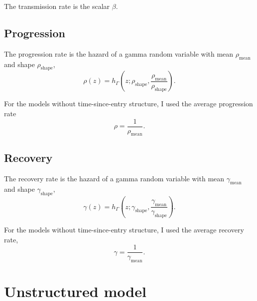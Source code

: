 \documentclass[USenglish]{article}
\begin{document}
The transmission rate is the scalar $\beta$.


\subsection{Progression}

The progression rate is the hazard of a gamma random variable with
mean $\rho_{\mathrm{mean}}$ and shape $\rho_{\mathrm{shape}}$,
\begin{equation}
  \rho(z) =
  h_{\Gamma}\left(z;
                 \rho_{\mathrm{shape}},
                 \frac{\rho_{\mathrm{mean}}}{\rho_{\mathrm{shape}}}\right).
\end{equation}

For the models without time-since-entry structure, I used the average
progression rate
\begin{equation}
  \rho = \frac{1}{\rho_{\mathrm{mean}}}.
\end{equation}


\subsection{Recovery}

The recovery rate is the hazard of a gamma random variable with mean
$\gamma_{\mathrm{mean}}$ and shape $\gamma_{\mathrm{shape}}$,
\begin{equation}
  \gamma(z) =
  h_{\Gamma}\left(z;
                 \gamma_{\mathrm{shape}},
                 \frac{\gamma_{\mathrm{mean}}}{\gamma_{\mathrm{shape}}}\right).
\end{equation}

For the models without time-since-entry structure, I used the average
recovery rate,
\begin{equation}
  \gamma = \frac{1}{\gamma_{\mathrm{mean}}}.
\end{equation}


\section{Unstructured model}
\end{document}

